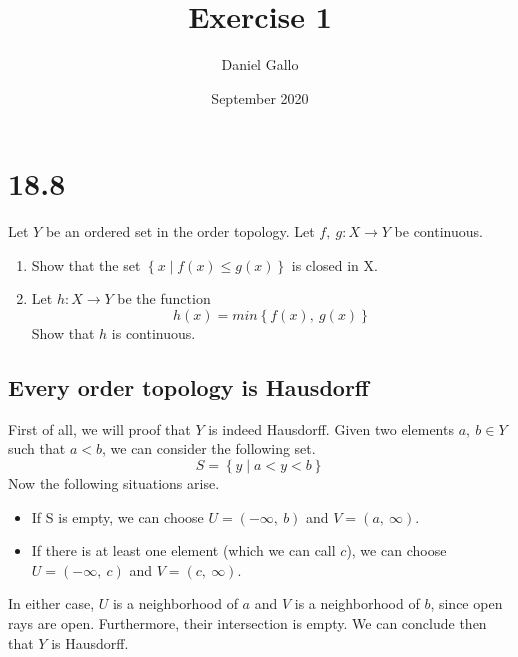 \documentclass{article}
\title{Exercise 1}
\author{Daniel Gallo}
\date{September 2020}
\begin{document}
\maketitle
\section*{18.8}
\begin{tcolorbox}[title=Statement]
    Let $Y$ be an ordered set in the order topology. Let $f,\ g \colon X \rightarrow Y$ be continuous.
    \begin{enumerate}
    \item Show that the set $\left\{x \mid f(x) \leq g(x)\right\}$ is closed in X.
    \item Let $h\colon X \rightarrow Y$ be the function
    \begin{equation*}
        h(x) = min\left\{f(x),\ g(x)\right\}
    \end{equation*}
    Show that $h$ is continuous.
    \end{enumerate}
\end{tcolorbox}
\subsection*{Every order topology is Hausdorff}
First of all, we will proof that $Y$ is indeed Hausdorff. Given two elements $a,\ b \in Y$ such that $a < b$, we can consider the following set.
\begin{equation*}
    S = \left\{y \mid a < y < b\right\}
\end{equation*}
Now the following situations arise.
\begin{itemize}
    \item If S is empty, we can choose $U = \left(-\infty,\ b\right)$ and $V = \left(a,\ \infty\right)$.
    \item If there is at least one element (which we can call $c$), we can choose $U = \left(-\infty,\ c\right)$ and $V = \left(c,\ \infty\right)$.
\end{itemize}
In either case, $U$ is a neighborhood of $a$ and $V$ is a neighborhood of $b$, since open rays are open. Furthermore, their intersection is empty. We can conclude then that $Y$ is Hausdorff.
\end{document}
